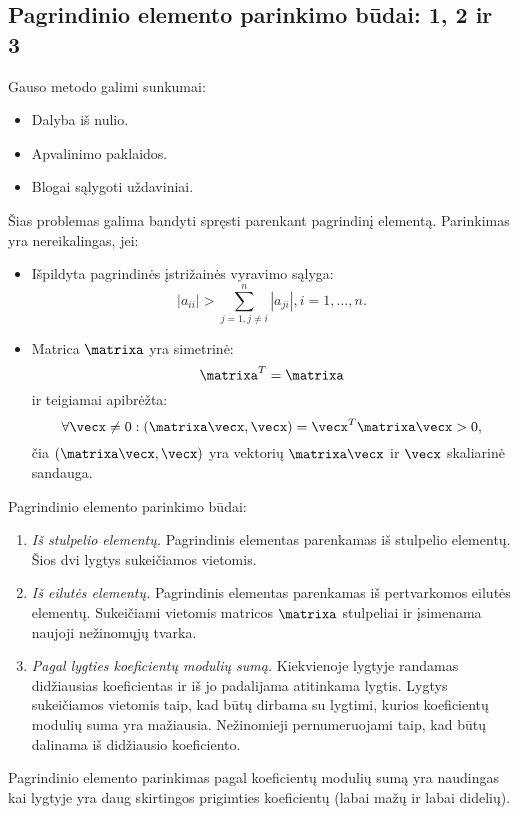 \subsection{Pagrindinio elemento parinkimo būdai: 1, 2 ir 3}

\cite[66-68]{textbook}

Gauso metodo galimi sunkumai:
\begin{itemize}
  \item Dalyba iš nulio.
  \item Apvalinimo paklaidos.
  \item Blogai sąlygoti uždaviniai.
\end{itemize}
Šias problemas galima bandyti spręsti parenkant pagrindinį elementą.
Parinkimas yra nereikalingas, jei:
\begin{itemize}
  \item Išpildyta pagrindinės įstrižainės vyravimo sąlyga:
    \begin{equation*}
      |a_{ii}| > \sum^{n}_{j=1,j \neq i}|a_{ji}|, i = 1,\ldots,n.
    \end{equation*}
  \item Matrica $\matrixa$ yra simetrinė:
    \begin{equation*}
      \matrixa^{T} = \matrixa
    \end{equation*}
    ir teigiamai apibrėžta:
    \begin{equation*}
      \forall \vecx \neq 0 : (\matrixa\vecx,\vecx) = \vecx^{T}\matrixa\vecx > 0,
    \end{equation*}
    čia $(\matrixa\vecx,\vecx)$ yra vektorių $\matrixa\vecx$ ir $\vecx$
    skaliarinė sandauga.
\end{itemize}

Pagrindinio elemento parinkimo būdai:
\begin{enumerate}
  \item \emph{Iš stulpelio elementų.}
    Pagrindinis elementas parenkamas iš stulpelio elementų. Šios dvi lygtys
    sukeičiamos vietomis.
  \item \emph{Iš eilutės elementų.}
    Pagrindinis elementas parenkamas iš pertvarkomos eilutės elementų.
    Sukeičiami vietomis matricos $\matrixa$ stulpeliai ir įsimenama naujoji
    nežinomųjų tvarka.
  \item \emph{Pagal lygties koeficientų modulių sumą.}
    Kiekvienoje lygtyje randamas didžiausias koeficientas ir iš jo
    padalijama atitinkama lygtis. Lygtys sukeičiamos vietomis taip, kad
    būtų dirbama su lygtimi, kurios koeficientų modulių suma yra mažiausia.
    Nežinomieji pernumeruojami taip, kad būtų dalinama iš didžiausio
    koeficiento.
\end{enumerate}
Pagrindinio elemento parinkimas pagal koeficientų modulių sumą yra
naudingas kai lygtyje yra daug skirtingos prigimties koeficientų (labai
mažų ir labai didelių).

